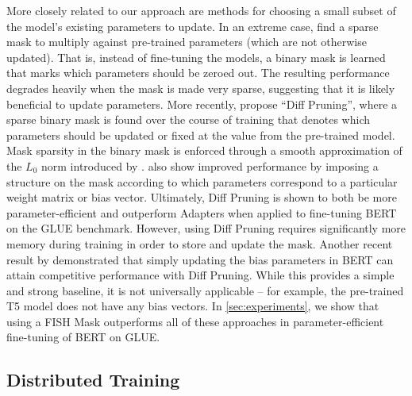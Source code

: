More closely related to our approach are methods for choosing a small subset of the model's existing parameters to update. In an extreme case, \citet{DBLP:journals/corr/abs-2004-12406} find a sparse mask to multiply against pre-trained parameters (which are not otherwise updated). That is, instead of fine-tuning the models, a binary mask is learned that marks which parameters should be zeroed out. The resulting performance degrades heavily when the mask is made very sparse, suggesting that it is likely beneficial to update parameters. More recently, \citet{DBLP:journals/corr/abs-2012-07463} propose ``Diff Pruning'', where a sparse binary mask is found over the course of training that denotes which parameters should be updated or fixed at the value from the pre-trained model. Mask sparsity in the binary mask is enforced through a smooth approximation of the $L_0$ norm introduced by \citet{louizos2017learning}.
\citet{DBLP:journals/corr/abs-2012-07463} also show improved performance by imposing a structure on the mask according to which parameters correspond to a particular weight matrix or bias vector. Ultimately, Diff Pruning is shown to both be more parameter-efficient and outperform Adapters when applied to fine-tuning BERT on the GLUE benchmark. However, using Diff Pruning requires significantly more memory during training in order to store and update the mask. Another recent result by \citet{benzaken2021bitfit} demonstrated that simply updating the bias parameters in BERT can attain competitive performance with Diff Pruning. While this provides a simple and strong baseline, it is not universally applicable -- for example, the pre-trained T5 model \cite{raffel2020exploring} does not have any bias vectors. In \ref{sec:experiments}, we show that using a FISH Mask outperforms all of these approaches in parameter-efficient fine-tuning of BERT on GLUE.

\subsection{Distributed Training} \label{ssec:distributed_training}

